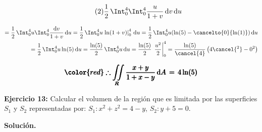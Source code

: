 \documentclass[12pt]{article}
\begin{document}
\begin{equation}\label{eqn:9-2}\tag{2}
	\frac{1}{2}\,\Int_0^4\Int_0^4 \frac{u}{1+v}\, \mathrm{d}v\,\mathrm{d}u
\end{equation}

\begin{align*}
	= \frac{1}{2}\,\Int_0^4 u \Int_0^4 \frac{\mathrm{d}v}{1+v}\, \mathrm{d}u
	= \frac{1}{2}\,\Int_0^4 u \left.\ln(1+v)\right|_0^4\, \mathrm{d}u = \frac{1}{2}\,\Int_0^4 u( \ln(5)-\cancelto{0}{\ln(1)})\, \mathrm{d}u \\
	= \frac{1}{2}\,\Int_0^4 u \ln(5)\, \mathrm{d}u = \frac{\ln(5)}{2}\,\Int_0^4 u\, \mathrm{d}u = \frac{\ln(5)}{2}\, \left.\frac{u^2}{2}\right|_0^4 = \frac{\ln(5)}{\cancel{4}}\left(4\cancel{^2}-0^2\right)
\end{align*}

\begin{align*}
	\pmb{\color{red} \therefore \iint\limits_R \frac{x+y}{1+x-y}\, \mathrm{d}A\, = \,4\ln(5)}
\end{align*}

\noindent \textbf{Ejercicio 13:} Calcular el volumen de la región que es limitada por las superficies $S_1$ y $S_2$ representadas por: $S_1:x^2+z^2=4-y$, $S_2:y+5=0$.

\vspace{5mm}

\noindent \textbf{Solución.}
\end{document}
